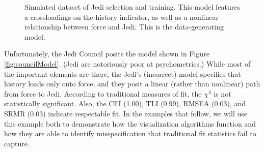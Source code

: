 \documentclass[
  english,
  doc]{apa6}
\begin{document}
\begin{figure}
\begin{center}
\caption{Simulated dataset of Jedi selection and training. This model features a crossloadings on the history indicator, as well as a nonlinear relationship between force and Jedi. This is the data-generating model.}
\label{fig:force}
\end{center}
\end{figure}

Unfortunately, the Jedi Council posits the model shown in Figure \ref{fig:councilModel}. (Jedi are notoriously poor at psychometrics.) While most of the important elements are there, the Jedi's (incorrect) model specifies that history loads only onto force, and they posit a linear (rather than nonlinear) path from force to Jedi. According to traditional measures of fit, the \(\chi^2\) is not statistically significant. Also, the CFI (1.00), TLI (0.99), RMSEA (0.03), and SRMR (0.03) indicate respectable fit. In the examples that follow, we will use this example both to demonstrate how the visualization algorithms function and how they are able to identify misspecification that traditional fit statistics fail to capture.
\end{document}
